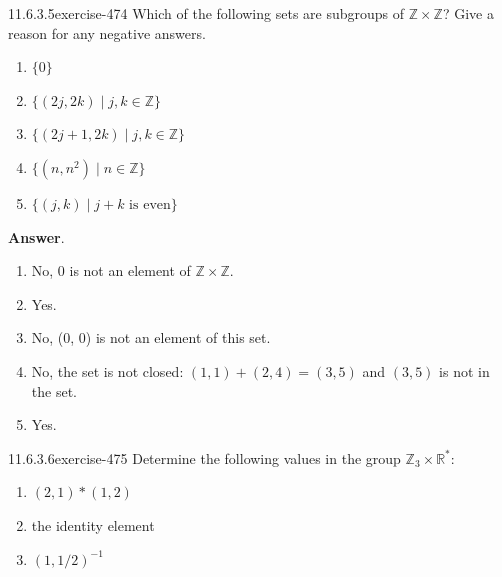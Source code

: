 \documentclass[twoside,10pt,]{book}
\numberwithin{equation}{section}
\begin{document}
\begin{divisionsolution}{11.6.3.5}{}{exercise-474}%
\hypertarget{p-4211}{}%
Which of the following sets are subgroups of \(\mathbb{Z} \times  \mathbb{Z}\)? Give a reason for any negative answers.\leavevmode%
\begin{enumerate}[label=(\alph*)]
\item\hypertarget{li-1919}{}\hypertarget{p-4212}{}%
\(\{0\}\)%
\item\hypertarget{li-1920}{}\hypertarget{p-4213}{}%
\(\{(2j, 2k) \mid j,k\in  \mathbb{Z}\}\)%
\item\hypertarget{li-1921}{}\hypertarget{p-4214}{}%
\(\{(2j+ 1, 2k) \mid j,k\in \mathbb{Z}\}\)%
\item\hypertarget{li-1922}{}\hypertarget{p-4215}{}%
\(\{(n, n^2 ) \mid n \in \mathbb{Z}\}\)%
\item\hypertarget{li-1923}{}\hypertarget{p-4216}{}%
\(\{(j, k) \mid j + k\textrm{ is} \textrm{ even}\}\)%
\end{enumerate}
%
\par\smallskip%
\noindent\textbf{Answer}.\quad%
\hypertarget{p-4217}{}%
\leavevmode%
\begin{enumerate}[label=(\alph*)]
\item\hypertarget{li-1924}{}\hypertarget{p-4218}{}%
No,  0 is not an element of \(\mathbb{Z} \times \mathbb{Z}\).%
\item\hypertarget{li-1925}{}\hypertarget{p-4219}{}%
Yes.%
\item\hypertarget{li-1926}{}\hypertarget{p-4220}{}%
No, (0, 0) is not an element of this set.%
\item\hypertarget{li-1927}{}\hypertarget{p-4221}{}%
No, the set is not closed: \((1, 1) + (2, 4) = (3, 5)\) and \((3, 5)\) is not in the set.%
\item\hypertarget{li-1928}{}\hypertarget{p-4222}{}%
Yes.%
\end{enumerate}
%
\end{divisionsolution}%
\begin{divisionsolution}{11.6.3.6}{}{exercise-475}%
\hypertarget{p-4223}{}%
Determine the following values in the group \(\mathbb{Z}_3 \times  \mathbb{R}^*\):\leavevmode%
\begin{enumerate}[label=(\alph*)]
\item\hypertarget{li-1929}{}\hypertarget{p-4224}{}%
\((2,1)* (1,2)\)%
\item\hypertarget{li-1930}{}\hypertarget{p-4225}{}%
the identity element%
\item\hypertarget{li-1931}{}\hypertarget{p-4226}{}%
\((1, 1/2)^{-1}\)%
\end{enumerate}
%
\end{divisionsolution}%
\end{document}
